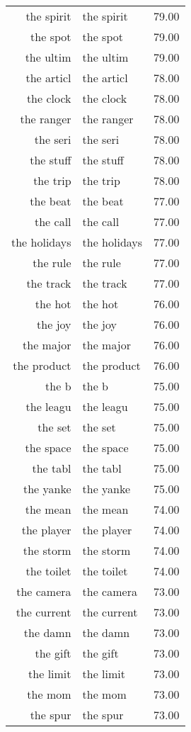 \begin{table}[ht]
\begin{tabular}{rlr}
  the spirit & the spirit & 79.00 \\ 
  the spot & the spot & 79.00 \\ 
  the ultim & the ultim & 79.00 \\ 
  the articl & the articl & 78.00 \\ 
  the clock & the clock & 78.00 \\ 
  the ranger & the ranger & 78.00 \\ 
  the seri & the seri & 78.00 \\ 
  the stuff & the stuff & 78.00 \\ 
  the trip & the trip & 78.00 \\ 
  the beat & the beat & 77.00 \\ 
  the call & the call & 77.00 \\ 
  the holidays & the holidays & 77.00 \\ 
  the rule & the rule & 77.00 \\ 
  the track & the track & 77.00 \\ 
  the hot & the hot & 76.00 \\ 
  the joy & the joy & 76.00 \\ 
  the major & the major & 76.00 \\ 
  the product & the product & 76.00 \\ 
  the b & the b & 75.00 \\ 
  the leagu & the leagu & 75.00 \\ 
  the set & the set & 75.00 \\ 
  the space & the space & 75.00 \\ 
  the tabl & the tabl & 75.00 \\ 
  the yanke & the yanke & 75.00 \\ 
  the mean & the mean & 74.00 \\ 
  the player & the player & 74.00 \\ 
  the storm & the storm & 74.00 \\ 
  the toilet & the toilet & 74.00 \\ 
  the camera & the camera & 73.00 \\ 
  the current & the current & 73.00 \\ 
  the damn & the damn & 73.00 \\ 
  the gift & the gift & 73.00 \\ 
  the limit & the limit & 73.00 \\ 
  the mom & the mom & 73.00 \\ 
  the spur & the spur & 73.00 \\ 

\end{tabular}
\end{table}
